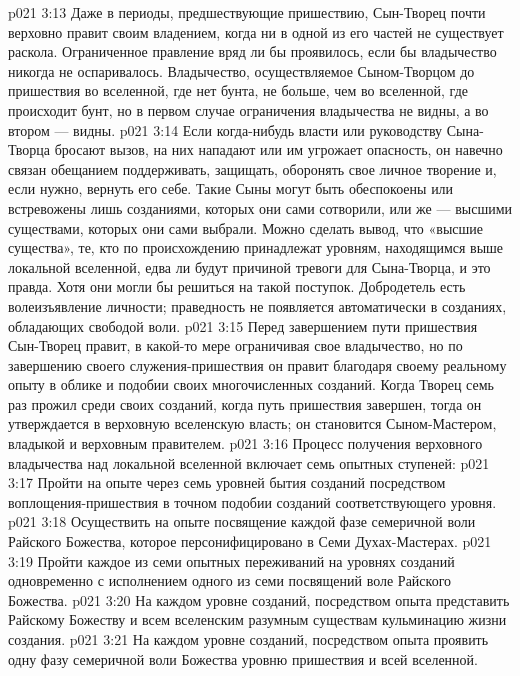 \vs p021 3:13 Даже в периоды, предшествующие пришествию, Сын\hyp{}Творец почти верховно правит своим владением, когда ни в одной из его частей не существует раскола. Ограниченное правление вряд ли бы проявилось, если бы владычество никогда не оспаривалось. Владычество, осуществляемое Сыном\hyp{}Творцом до пришествия во вселенной, где нет бунта, не больше, чем во вселенной, где происходит бунт, но в первом случае ограничения владычества не видны, а во втором --- видны.
\vs p021 3:14 Если когда\hyp{}нибудь власти или руководству Сына\hyp{}Творца бросают вызов, на них нападают или им угрожает опасность, он навечно связан обещанием поддерживать, защищать, оборонять свое личное творение и, если нужно, вернуть его себе. Такие Сыны могут быть обеспокоены или встревожены лишь созданиями, которых они сами сотворили, или же --- высшими существами, которых они сами выбрали. Можно сделать вывод, что «высшие существа», те, кто по происхождению принадлежат уровням, находящимся выше локальной вселенной, едва ли будут причиной тревоги для Сына\hyp{}Творца, и это правда. Хотя они могли бы решиться на такой поступок. Добродетель есть волеизъявление личности; праведность не появляется автоматически в созданиях, обладающих свободой воли.
\vs p021 3:15 Перед завершением пути пришествия Сын\hyp{}Творец правит, в какой\hyp{}то мере ограничивая свое владычество, но по завершению своего служения\hyp{}пришествия он правит благодаря своему реальному опыту в облике и подобии своих многочисленных созданий. Когда Творец семь раз прожил среди своих созданий, когда путь пришествия завершен, тогда он утверждается в верховную вселенскую власть; он становится Сыном\hyp{}Мастером, владыкой и верховным правителем.
\vs p021 3:16 \pc Процесс получения верховного владычества над локальной вселенной включает семь опытных ступеней:
\vs p021 3:17 \bibnobreakspace Пройти на опыте через семь уровней бытия созданий посредством воплощения\hyp{}пришествия в точном подобии созданий соответствующего уровня.
\vs p021 3:18 \bibnobreakspace Осуществить на опыте посвящение каждой фазе семеричной воли Райского Божества, которое персонифицировано в Семи Духах\hyp{}Мастерах.
\vs p021 3:19 \bibnobreakspace Пройти каждое из семи опытных переживаний на уровнях созданий одновременно с исполнением одного из семи посвящений воле Райского Божества.
\vs p021 3:20 \bibnobreakspace На каждом уровне созданий, посредством опыта представить Райскому Божеству и всем вселенским разумным существам кульминацию жизни создания.
\vs p021 3:21 \bibnobreakspace На каждом уровне созданий, посредством опыта проявить одну фазу семеричной воли Божества уровню пришествия и всей вселенной.
